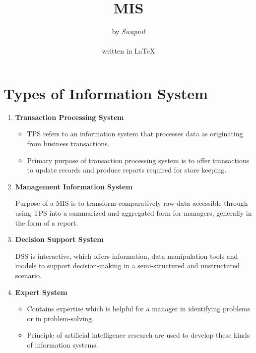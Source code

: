 \documentclass[10pt]{article}
\title{\Huge{MIS}}
\author{by \LARGE{\emph{Swapnil}}\\ \ \\ written in {\LaTeX}}
\begin{document}
\maketitle
\Large

\section{Types of Information System}
\begin{enumerate}
  \item \textbf{Transaction Processing System}
    \begin{itemize}
      
      \item TPS refers to an information system that 
            processes data as originating from business transactions.

      \item Primary purpose 
            of transaction processing system is to offer transactions to update records 
            and produce reports required for store keeping.

    \end{itemize}


  \item \textbf{Management Information System}

    Purpose of a MIS is to transform comparatively 
    raw data accessible through using TPS into a summarized
    and aggregated form for managers, generally in the form of a report.

  \item \textbf{Decision Support System}

    DSS is interactive, which offers information, data manipulation tools and models
    to support decision-making in a semi-structured and unstructured scenario.

  \item \textbf{Expert System}
    \begin{itemize}
      
      \item Contains expertise which is helpful for a manager in identifying
            problems or in problem-solving.

      \item Principle of artificial intelligence research 
            are used to develop these kinds of information systems.
    \end{itemize}


\end{enumerate}
\end{document}
